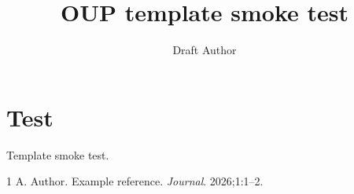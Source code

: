 \documentclass[unnumsec,webpdf,modern,large]{../drafts/oup-authoring-template}
\begin{document}
\title[OUP template smoke test]{OUP template smoke test}
\author[1]{Draft Author}
\address[1]{Draft Affiliation}
\maketitle
\section{Test}
Template smoke test.
\begin{thebibliography}{1}
 A. Author. Example reference. \emph{Journal}. 2026;1:1--2.
\end{thebibliography}
\end{document}
